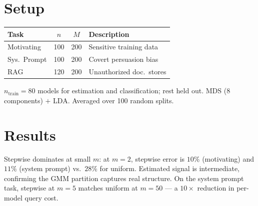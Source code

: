 \documentclass[9pt,twocolumn]{article}
\begin{document}
\section{Setup}

\begin{table}[h]
\vspace{-0.5em}
\centering
\small
\begin{tabular}{@{}lccp{3.2cm}@{}}
\toprule
Task & $n$ & $M$ & Description \\
\midrule
Motivating & 100 & 200 & Sensitive training data \\
Sys.\ Prompt & 100 & 200 & Covert persuasion bias \\
RAG & 120 & 200 & Unauthorized doc.\ stores \\
\bottomrule
\end{tabular}
\vspace{-0.5em}
\end{table}

$n_{\text{train}} = 80$ models for estimation and classification; rest held out.
MDS (8 components) $+$ LDA. Averaged over 100 random splits.

\section{Results}

Stepwise dominates at small $m$: at $m{=}2$, stepwise error is $10\%$ (motivating) and $11\%$ (system prompt) vs.\ $28\%$ for uniform.
Estimated signal is intermediate, confirming the GMM partition captures real structure.
On the system prompt task, stepwise at $m{=}5$ matches uniform at $m{=}50$ --- a $10\times$ reduction in per-model query cost.
\end{document}
